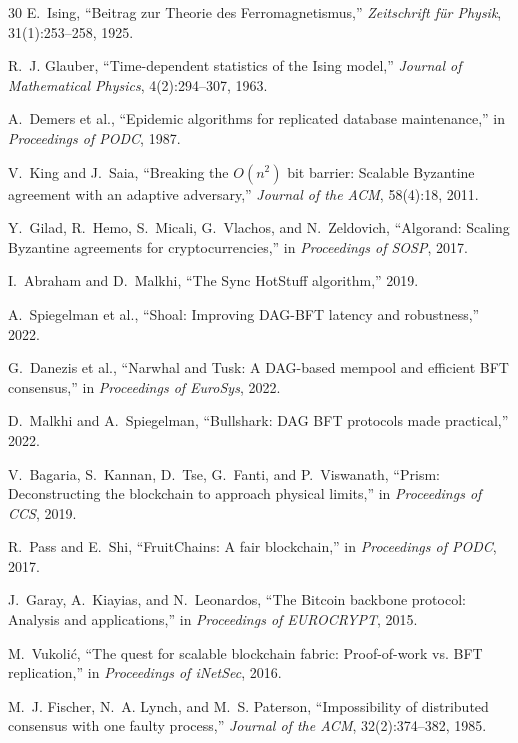 \begin{thebibliography}{30}
E.~Ising, ``Beitrag zur Theorie des Ferromagnetismus,''
\textit{Zeitschrift f{\"u}r Physik}, 31(1):253--258, 1925.

R.~J. Glauber, ``Time-dependent statistics of the Ising model,''
\textit{Journal of Mathematical Physics}, 4(2):294--307, 1963.

A.~Demers et al., ``Epidemic algorithms for replicated database maintenance,'' in
\textit{Proceedings of PODC}, 1987.

V.~King and J.~Saia, ``Breaking the $O(n^2)$ bit barrier: Scalable Byzantine agreement
with an adaptive adversary,'' \textit{Journal of the ACM}, 58(4):18, 2011.

Y.~Gilad, R.~Hemo, S.~Micali, G.~Vlachos, and N.~Zeldovich, ``Algorand: Scaling
Byzantine agreements for cryptocurrencies,'' in \textit{Proceedings of SOSP}, 2017.

I.~Abraham and D.~Malkhi, ``The Sync HotStuff algorithm,'' 2019.

A.~Spiegelman et al., ``Shoal: Improving DAG-BFT latency and robustness,'' 2022.

G.~Danezis et al., ``Narwhal and Tusk: A DAG-based mempool and efficient BFT
consensus,'' in \textit{Proceedings of EuroSys}, 2022.

D.~Malkhi and A.~Spiegelman, ``Bullshark: DAG BFT protocols made practical,'' 2022.

V.~Bagaria, S.~Kannan, D.~Tse, G.~Fanti, and P.~Viswanath, ``Prism: Deconstructing
the blockchain to approach physical limits,'' in \textit{Proceedings of CCS}, 2019.

R.~Pass and E.~Shi, ``FruitChains: A fair blockchain,'' in
\textit{Proceedings of PODC}, 2017.

J.~Garay, A.~Kiayias, and N.~Leonardos, ``The Bitcoin backbone protocol: Analysis and
applications,'' in \textit{Proceedings of EUROCRYPT}, 2015.

M.~Vukoli{\'c}, ``The quest for scalable blockchain fabric: Proof-of-work vs. BFT
replication,'' in \textit{Proceedings of iNetSec}, 2016.

M.~J. Fischer, N.~A. Lynch, and M.~S. Paterson, ``Impossibility of distributed
consensus with one faulty process,'' \textit{Journal of the ACM}, 32(2):374--382, 1985.


\end{thebibliography}
